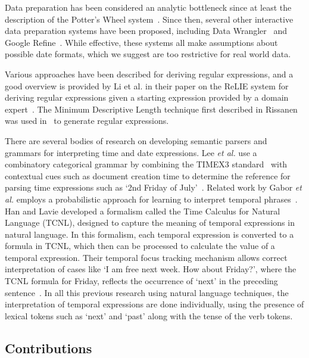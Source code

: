 
Data preparation has been considered an analytic bottleneck since at least the description of the Potter's Wheel system~\cite{Raman:2001}. Since then, several other interactive data preparation systems have been proposed, including Data Wrangler~\cite{Kandel:2011} and Google Refine~\cite{Refine}. While effective, these systems all make assumptions about possible date formats, which we suggest are too restrictive for real world data.

Various approaches have been described for deriving regular expressions, and a good overview is provided by Li et al. in their paper on the ReLIE system for deriving regular expressions given a starting expression provided by a domain expert~\cite{Li:2008}. The Minimum Descriptive Length technique first described in Rissanen~\cite{Rissanen:1978} was used in~\cite{Raman:2001} to generate regular expressions. 

There are several bodies of research on developing semantic parsers and grammars for interpreting time and date expressions. Lee \textit{et al.} use a combinatory categorical grammar by combining the TIMEX3 standard~\cite{timex3} with contextual cues such as document creation time to determine the reference for parsing time expressions such as `2nd Friday of July'~\cite{LeeADZ14}. Related work by Gabor \textit{et al.} employs a probabilistic approach for learning to interpret temporal phrases~\cite{Angeli:2012}. Han and Lavie developed a formalism called the Time Calculus for Natural Language (TCNL), designed to capture the meaning of temporal expressions in natural language. In this formalism, each temporal expression is converted to a formula in TCNL, which then can be processed to calculate the value of a temporal expression. Their temporal focus tracking mechanism allows correct interpretation of cases like `I am free next week. How
about Friday?', where the TCNL formula for Friday, reflects the occurrence of `next' in the preceding sentence~\cite{Han:2004}.  In all this previous research using natural language techniques, the interpretation of temporal expressions are done individually, using the presence of lexical tokens such as `next' and `past' along with the tense of the verb tokens.

\subsection{Contributions}

